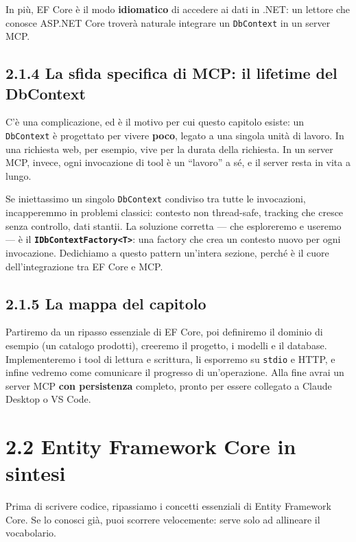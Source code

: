 \documentclass[
  italian,
  10pt,
]{book}
\begin{document}
In più, EF Core è il modo \textbf{idiomatico} di accedere ai dati in
.NET: un lettore che conosce ASP.NET Core troverà naturale integrare un
\texttt{DbContext} in un server MCP.

\subsection{2.1.4 La sfida specifica di MCP: il lifetime del
DbContext}\label{la-sfida-specifica-di-mcp-il-lifetime-del-dbcontext}

C'è una complicazione, ed è il motivo per cui questo capitolo esiste: un
\texttt{DbContext} è progettato per vivere \textbf{poco}, legato a una
singola unità di lavoro. In una richiesta web, per esempio, vive per la
durata della richiesta. In un server MCP, invece, ogni invocazione di
tool è un ``lavoro'' a sé, e il server resta in vita a lungo.

Se iniettassimo un singolo \texttt{DbContext} condiviso tra tutte le
invocazioni, incapperemmo in problemi classici: contesto non
thread-safe, tracking che cresce senza controllo, dati stantii. La
soluzione corretta --- che esploreremo e useremo --- è il
\textbf{\texttt{IDbContextFactory\textless{}T\textgreater{}}}: una
factory che crea un contesto nuovo per ogni invocazione. Dedichiamo a
questo pattern un'intera sezione, perché è il cuore dell'integrazione
tra EF Core e MCP.

\subsection{2.1.5 La mappa del capitolo}\label{la-mappa-del-capitolo}

Partiremo da un ripasso essenziale di EF Core, poi definiremo il dominio
di esempio (un catalogo prodotti), creeremo il progetto, i modelli e il
database. Implementeremo i tool di lettura e scrittura, li esporremo su
\texttt{stdio} e HTTP, e infine vedremo come comunicare il progresso di
un'operazione. Alla fine avrai un server MCP \textbf{con persistenza}
completo, pronto per essere collegato a Claude Desktop o VS Code.

\section{2.2 Entity Framework Core in
sintesi}\label{entity-framework-core-in-sintesi}

Prima di scrivere codice, ripassiamo i concetti essenziali di Entity
Framework Core. Se lo conosci già, puoi scorrere velocemente: serve solo
ad allineare il vocabolario.
\end{document}
